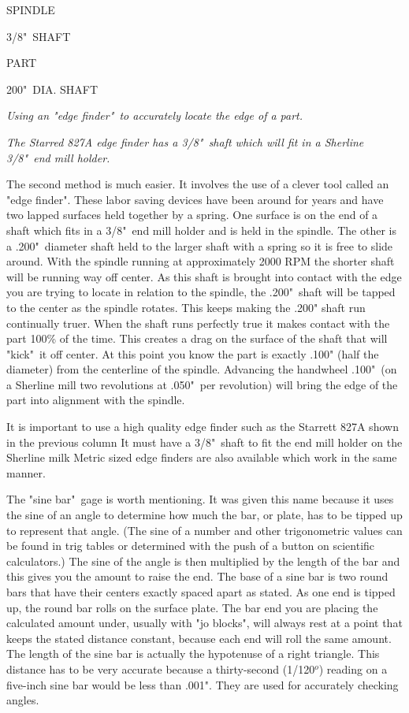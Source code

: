 \bigskip
SPINDLE

3/8"\ SHAFT

PART

200"\ DIA. SHAFT
\bigskip

\textit{Using an "edge finder"\ to accurately locate the edge of a part.}
\bigskip

\textit{The Starred 827A edge finder has a 3/8"\ shaft which will fit in a
Sherline 3/8"\ end mill holder.}
\bigskip

The second method is much easier. It involves the use of a clever tool called an
"edge finder". These labor saving devices have been around for years and have
two lapped surfaces held together by a spring. One surface is on the end of a
shaft which fits in a 3/8"\ end mill holder and is held in the spindle. The other
is a .200"\ diameter shaft held to the larger shaft with a spring so it is free
to slide around. With the spindle running at approximately 2000 RPM the shorter
shaft will be running way off center. As this shaft is brought into contact with
the edge you are trying to locate in relation to the spindle, the .200"\ shaft
will be tapped to the center as the spindle rotates. This keeps making the .200"
shaft run continually truer. When the shaft runs perfectly true it makes contact
with the part 100\% of the time. This creates a drag on the surface of the shaft
that will "kick"\ it off center. At this point you know the part is exactly .100"
(half the diameter) from the centerline of the spindle. Advancing the handwheel
.100"\ (on a Sherline mill two revolutions at .050"\ per revolution) will bring
the edge of the part into alignment with the spindle.

It is important to use a high quality edge finder such as the Starrett 827A
shown in the previous column It must have a 3/8"\ shaft to fit the end mill
holder on the Sherline milk Metric sized edge finders are also available which
work in the same manner.


The "sine bar"\ gage is worth mentioning. It was given this name because it uses
the sine of an angle to determine how much the bar, or plate, has to be tipped
up to represent that angle. (The sine of a number and other trigonometric values
can be found in trig tables or determined with the push of a button on
scientific calculators.) The sine of the angle is then multiplied by the length
of the bar and this gives you the amount to raise the end. The base of a sine
bar is two round bars that have their centers exactly spaced apart as stated. As
one end is tipped up, the round bar rolls on the surface plate. The bar end you
are placing the calculated amount under, usually with "jo blocks", will always
rest at a point that keeps the stated distance constant, because each end will
roll the same amount. The length of the sine bar is actually the hypotenuse of a
right triangle. This distance has to be very accurate because a thirty-second
(1/120$^o$) reading on a five-inch sine bar would be less than .001". They are
used for accurately checking angles.

